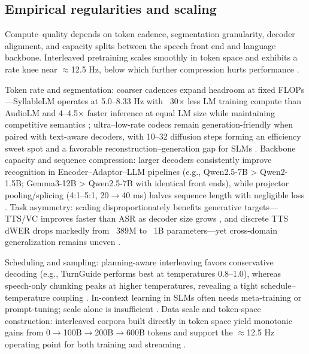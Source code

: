 \documentclass{article}
\begin{document}
\subsection{Empirical regularities and scaling} \label{subsec:Empirical regularities and scaling}
Compute--quality depends on token cadence, segmentation granularity, decoder alignment, and capacity splits between the speech front end and language backbone. Interleaved pretraining scales smoothly in token space and exhibits a rate knee near $\approx$12.5 Hz, below which further compression hurts performance \cite{zeng2024scalingspeechtextpretrainingsyntheticint}.

Token rate and segmentation: coarser cadences expand headroom at fixed FLOPs---SyllableLM operates at 5.0--8.33 Hz with ~30$\times$ less LM training compute than AudioLM and 4--4.5$\times$ faster inference at equal LM size while maintaining competitive semantics \cite{baade2024syllablelmlearningcoarsesemanticunitsspe}; ultra--low-rate codecs remain generation-friendly when paired with text-aware decoders, with 10--32 diffusion steps forming an efficiency sweet spot and a favorable reconstruction--generation gap for SLMs \cite{wang2025tadicodectextawarediffusionspeechtokeniz}. Backbone capacity and sequence compression: larger decoders consistently improve recognition in Encoder--Adaptor--LLM pipelines (e.g., Qwen2.5-7B > Qwen2-1.5B; Gemma3-12B > Qwen2.5-7B with identical front ends), while projector pooling/splicing (4:1--5:1, 20$\rightarrow$40 ms) halves sequence length with negligible loss \cite{li2025transsionmultilingualspeechrecognitionsy,nguyen2025qwenvsgemmaintegrationwhispercomparative}. Task asymmetry: scaling disproportionately benefits generative targets---TTS/VC improves faster than ASR as decoder size grows \cite{wu2024speechcomposerunifyingmultiplespeechtask}, and discrete TTS dWER drops markedly from ~389M to ~1B parameters---yet cross-domain generalization remains uneven \cite{wang2024evaluatingtextspeechsynthesislargediscre,huang2025dynamicsuperbphase2collaborativelyexpand}.

Scheduling and sampling: planning-aware interleaving favors conservative decoding (e.g., TurnGuide performs best at temperatures 0.8--1.0), whereas speech-only chunking peaks at higher temperatures, revealing a tight schedule--temperature coupling \cite{cui2025thinkbeforeyoutalkenhancingmeaningfuldia}. In-context learning in SLMs often needs meta-training or prompt-tuning; scale alone is insufficient \cite{hsu2024exploringcontextlearningtextlessspeechla}. Data scale and token-space construction: interleaved corpora built directly in token space yield monotonic gains from 0$\rightarrow$100B$\rightarrow$200B$\rightarrow$600B tokens and support the $\approx$12.5 Hz operating point for both training and streaming \cite{zeng2024scalingspeechtextpretrainingsyntheticint}.
\end{document}
